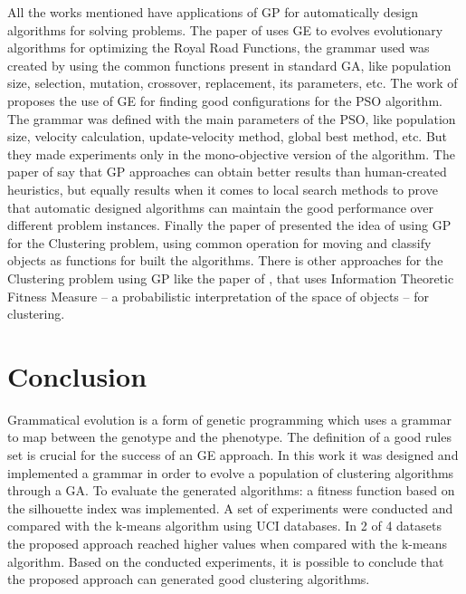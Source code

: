 \documentclass[journal]{IEEEtran}
\begin{document}
	All the works mentioned have applications of GP for automatically design algorithms for solving problems. The paper of \cite{lourencco2012evolving} uses GE to evolves evolutionary algorithms for optimizing the Royal Road Functions, the grammar used was created by using the common functions present in standard GA, like population size, selection, mutation, crossover, replacement, its parameters, etc. The work of \cite{miranda2015gefpso} proposes the use of GE for finding good configurations for the PSO algorithm. The grammar was defined with the main parameters of the PSO, like population size, velocity calculation, update-velocity method, global best method, etc. But they made experiments only in the mono-objective version of the algorithm. The paper of \cite{burke2012grammatical} say that GP approaches can obtain better results than human-created heuristics, but equally results when it comes to local search methods to prove that automatic designed algorithms can maintain the good performance over different problem instances. Finally the paper of \cite{bolton2015optimizing} presented the idea of using GP for the Clustering problem, using common operation for moving and classify objects as functions for built the algorithms. There is other approaches for the Clustering problem using GP like the paper of \cite{boric2007genetic}, that uses Information Theoretic Fitness Measure -- a probabilistic interpretation of the space of objects -- for clustering.
	
		
	\section{Conclusion}
	\label{sec:conclusion}
	
	Grammatical evolution is a form of genetic programming which uses a grammar to map between the genotype and the phenotype. The definition of a good rules set is crucial for the success of an GE approach. In this work it was designed and implemented a grammar in order to evolve a population of clustering algorithms through a GA. To evaluate the generated algorithms: a fitness function based on the silhouette index was implemented.
	A set of experiments were conducted and compared with the k-means algorithm using UCI databases. In 2 of 4 datasets the proposed approach reached higher values when compared with the k-means algorithm.
	Based on the conducted experiments, it is possible to conclude that the proposed approach can generated good clustering algorithms.
	
	
	
	
\end{document}
